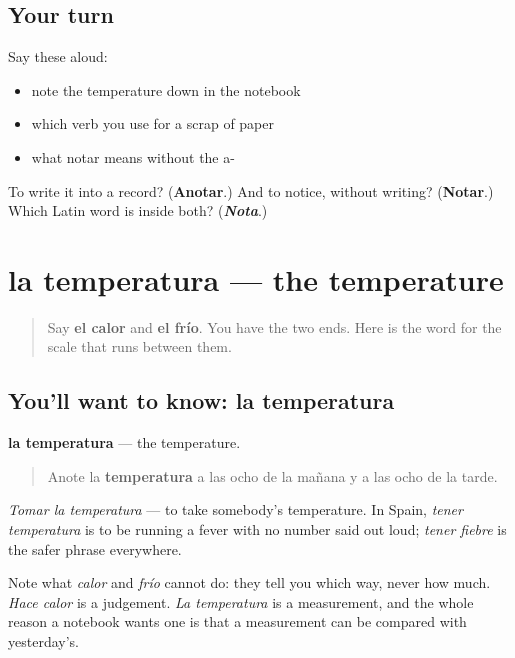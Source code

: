 \subsection*{Your turn}
Say these aloud:

\begin{itemize}
\raggedright
  \item note the temperature down in the notebook
  \item which verb you use for a scrap of paper
  \item what notar means without the a-
\end{itemize}

\begin{tcolorbox}[breakable,colback=teal!4,colframe=teal!35!black,title={Before you move on}]
To write it into a record? (\textbf{Anotar}.) And to notice, without writing? (\textbf{Notar}.) Which Latin word is inside both? (\emph{\textbf{Nota}}.)
\end{tcolorbox}
\section[la temperatura]{la temperatura — the temperature}

\label{lesson:ES-C465-temperatura}



\begin{quote}
Say \textbf{el calor} and \textbf{el frío}. You have the two ends. Here is the word for the scale that runs between them.
\end{quote}

\subsection*{You'll want to know: la temperatura}
\textbf{la temperatura} — the temperature.

\begin{quote}
Anote la \textbf{temperatura} a las ocho de la mañana y a las ocho de la tarde.
\end{quote}

\emph{Tomar la temperatura} — to take somebody's temperature. In Spain, \emph{tener temperatura} is to be running a fever with no number said out loud; \emph{tener fiebre} is the safer phrase everywhere.

Note what \emph{calor} and \emph{frío} cannot do: they tell you which way, never how much. \emph{Hace calor} is a judgement. \emph{La temperatura} is a measurement, and the whole reason a notebook wants one is that a measurement can be compared with yesterday's.


